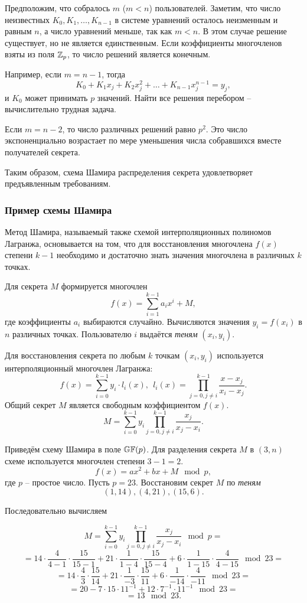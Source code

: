 Предположим, что собралось $m$ ($m<n$) пользователей. Заметим, что число неизвестных $K_0, K_1, \dots, K_{n-1}$ в системе уравнений осталось неизменным и равным $n$, а число уравнений меньше, так как $m<n$. В этом случае решение существует, но не является единственным. Если коэффициенты многочленов взяты из поля $\mathbb{Z}_p$, то число решений является конечным.

Например, если $m = n - 1$, тогда
    \[ K_0 + K_1 x_j + K_2 x_j^2 + \dots + K_{n-1} x_j^{n-1} = y_j, \]
и $K_0$ может принимать $p$ значений. Найти все решения перебором -- вычислительно трудная задача.

Если $m = n - 2$, то число различных решений равно $p^2$. Это число экспоненциально возрастает по мере уменьшения числа собравшихся вместе получателей секрета.

Таким образом, схема Шамира распределения секрета удовлетворяет предъявленным требованиям.

\subsubsection{Пример схемы Шамира}

Метод Шамира, называемый также схемой интерполяционных полиномов Лагранжа, основывается на том, что для восстановления многочлена $f(x)$ степени $k-1$ необходимо и достаточно знать значения многочлена в различных $k$ точках.

Для секрета $M$ формируется многочлен
    \[ f(x) = \sum\limits_{i=1}^{k-1} a_i x^i + M, \]
где коэффициенты $a_i$ выбираются случайно. Вычисляются значения $y_i = f(x_i)$ в $n$ различных точках. Пользователю $i$ выдаётся \emph{теням} $(x_i, y_i)$.

Для восстановления секрета по любым $k$ точкам $(x_i, y_i)$ используется интерполяционный многочлен Лагранжа:
    \[ f(x) = \sum\limits_{i=0}^{k-1} y_i \cdot l_i(x), ~~ l_i(x) = \prod\limits_{j=0, j \neq i}^{k-1} \frac{x - x_j}{x_i - x_j}. \]
Общий секрет $M$ является свободным коэффициентом $f(x)$.
    \[ M = \sum\limits_{i=0}^{k-1} y_i \prod\limits_{j=0, j \neq i}^{k-1} \frac{x_j}{x_j - x_i}. \]

\example
Приведём схему Шамира в поле $\mathbb{GF}(p)$. Для разделения секрета $M$ в $(3,n)$ схеме используется многочлен степени $3-1=2$.
    \[ f(x) = a x^2 + b x + M \mod p, \]
где $p$ -- простое число. Пусть $p=23$. Восстановим секрет $M$ по \emph{теням}
    \[ (1,14), (4,21), (15,6). \]

Последовательно вычисляем

    \[ M = \sum\limits_{i=0}^{k-1} y_i \prod\limits_{j=0, j \neq i}^{k-1} \frac{x_j}{x_j - x_i} \mod p = \]
    \[= 14 \cdot \frac{4}{4-1} \cdot \frac{15}{15-1} + 21 \cdot \frac{1}{1-4} \cdot \frac{15}{15-4} + 6 \cdot \frac{1}{1-15} \cdot \frac{4}{4-15} \mod 23 = \]
    \[ =14 \cdot \frac{4}{3} \cdot \frac{15}{14} + 21 \cdot \frac{1}{-3} \cdot \frac{15}{11} + 6 \cdot \frac{1}{-14} \cdot \frac{4}{-11} \mod 23 = \]
    \[= 20 - 7 \cdot 15 \cdot 11^{-1} + 12 \cdot 7^{-1} \cdot 11^{-1} \mod 23 = \]
    \[ = 13 \mod 23.\]
\exampleend
